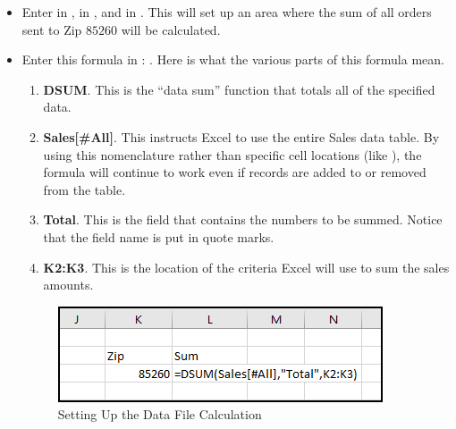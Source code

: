 \begin{itemize}[resume]
	\item Enter  in ,  in , and  in . This will set up an area where the sum of all orders sent to Zip $ 85260 $ will be calculated.
	\item Enter this formula in : . Here is what the various parts of this formula mean.

	\begin{enumerate}
		\item \textbf{DSUM}. This is the ``data sum'' function that totals all of the specified data.
		\item \textbf{Sales[\#All]}. This instructs Excel to use the entire Sales data table. By using this nomenclature rather than specific cell locations (like ), the formula will continue to work even if records are added to or removed from the table.
		\item \textbf{Total}. This is the field that contains the numbers to be summed. Notice that the field name is put in quote marks.
		\item \textbf{K2:K3}. This is the location of the criteria Excel will use to sum the sales amounts.
	\end{enumerate}	

	\begin{figure}[H]
		\centering
		\includegraphics[width=\maxwidth{.95\linewidth}]{gfx/ch09_fig21}
		\caption{Setting Up the Data File Calculation}
		\label{09:fig21}
	\end{figure}


\end{itemize}
